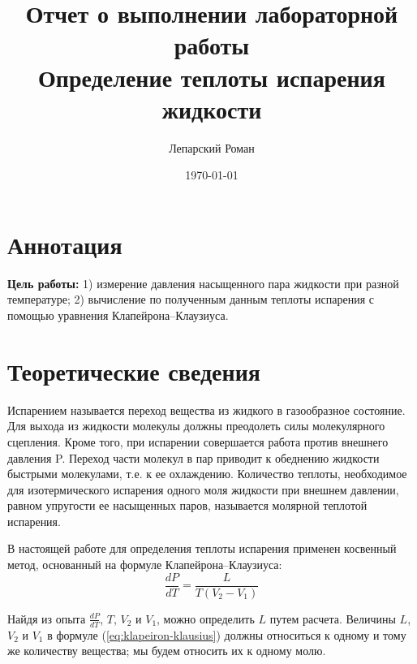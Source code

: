 \documentclass[12pt]{article}
\title{Отчет о выполнении лабораторной работы \\ Определение теплоты испарения жидкости}
\author{Лепарский Роман}
\date{\today}
\begin{document}
\maketitle

\newpage

\section{Аннотация}

\textbf{Цель работы:} 1) измерение давления насыщенного пара жидкости при разной температуре; 2) вычисление по полученным данным теплоты испарения с помощью уравнения Клапейрона–Клаузиуса.

\section{Теоретические сведения}

Испарением называется переход вещества из жидкого в газообразное состояние. Для выхода из жидкости молекулы должны преодолеть силы молекулярного сцепления. Кроме того, при испарении совершается работа против внешнего давления
P. Переход части молекул в пар приводит к обеднению жидкости быстрыми молекулами, т.е. к ее охлаждению.
Количество теплоты, необходимое для изотермического испарения одного моля жидкости при внешнем давлении, равном упругости ее насыщенных паров, называется молярной
теплотой испарения.

В настоящей работе для определения теплоты испарения применен
косвенный метод, основанный на формуле Клапейрона–Клаузиуса:
\begin{equation}
	\frac{dP}{dT} = \frac{L}{T(V_2 - V_1)}
	\label{eq:klapeiron-klausius}
\end{equation}

Найдя из опыта $\frac{dP}{dT}$, $T$, $V_2$ и $V_1$, можно определить $L$ путем расчета. Величины $L$, $V_2$ и $V_1$ в формуле (\ref{eq:klapeiron-klausius}) должны относиться к одному и тому же количеству вещества; мы будем относить их
к одному молю.
\end{document}

